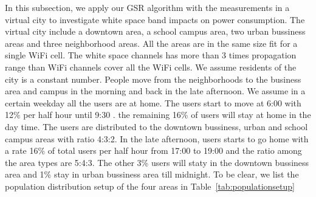 In this subsection, we apply our GSR algorithm with the measurements in a virtual city to investigate 
white space band impacts on power consumption. 
The virtual city include a downtown area, a school campus area, two urban bussiness areas and three 
neighborhood areas. All the areas are in the same size fit for a single WiFi cell. 
The white space channels has more than 3 times propagation range than WiFi channels cover 
all the WiFi cells.
We assume residents of the city is a constant number. 
People move from the neighborhoods to the business area and campus in the morning and back in the late 
afternoon. We assume in a certain weekday all the users are at home. 
The users start to move at 6:00  with 12\% per half hour until 
9:30 . the remaining 16\% of users will stay at home in the day time. 
The users are distributed to the downtown bussiness, urban and school campus areas with ratio 4:3:2.
In the late afternoon, users starts to go home 
with a rate 16\% of total users per half hour from 17:00 to 19:00 and 
the ratio among the area types are 5:4:3.
The other 3\% users will staty 
in the downtown bussiness area and 1\% stay in urban bussiness area till midnight. 
To be clear, we list the population distribution setup of the four areas in Table~\ref{tab:populationsetup}


